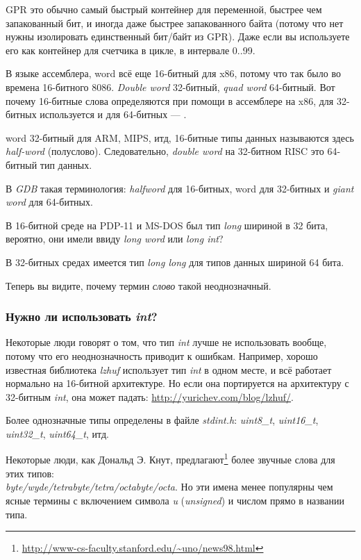 \myhrule{}

\ac{GPR} это обычно самый быстрый контейнер для переменной, быстрее чем запакованный бит, и иногда даже быстрее запакованного
байта (потому что нет нужны изолировать единственный бит/байт из \ac{GPR}).
Даже если вы используете его как контейнер для счетчика в цикле, в интервале 0..99.

\myhrule{}

В языке ассемблера, \gls{word} всё еще 16-битный для x86, потому что так было во времена 16-битного 8086.
\emph{Double word} 32-битный, \emph{quad word} 64-битный.
Вот почему 16-битные слова определяются при помощи  в ассемблере на x86, для 32-битных используется 
и для 64-битных --- .

\Gls{word} 32-битный для ARM, MIPS, итд, 16-битные типы данных называются здесь \emph{half-word} (полуслово).
Следовательно, \emph{double word} на 32-битном RISC это 64-битный тип данных.

В \emph{GDB} такая терминология: \emph{halfword} для 16-битных, \gls{word} для 32-битных и \emph{giant word} для 64-битных.

В 16-битной среде \CCpp{} на PDP-11 и MS-DOS был тип \emph{long} шириной в 32 бита, вероятно, они имели ввиду
\emph{long word} или \emph{long int}?

В 32-битных средах \CCpp{} имеется тип \emph{long long} для типов данных шириной 64 бита.

Теперь вы видите, почему термин \emph{слово} такой неоднозначный.

\subsubsection{Нужно ли использовать \emph{int}?}

Некоторые люди говорят о том, что тип \emph{int} лучше не использовать вообще, потому что его неоднозначность приводит
к ошибкам.
Например, хорошо известная библиотека \emph{lzhuf} использует тип \emph{int} в одном месте, и всё работает нормально на 16-битной
архитектуре.
Но если она портируется на архитектуру с 32-битным \emph{int}, она может падать: \url{http://yurichev.com/blog/lzhuf/}.

Более однозначные типы определены в файле \emph{stdint.h}:
\emph{uint8\_t}, \emph{uint16\_t}, \emph{uint32\_t}, \emph{uint64\_t}, итд.

Некоторые люди, как Дональд Э. Кнут, предлагают\footnote{\url{http://www-cs-faculty.stanford.edu/~uno/news98.html}}
более звучные слова для этих типов:\\
\emph{byte/wyde/tetrabyte/tetra/octabyte/octa}.
Но эти имена менее популярны чем ясные термины с включением символа \emph{u} (\emph{unsigned})
и числом прямо в названии типа.

